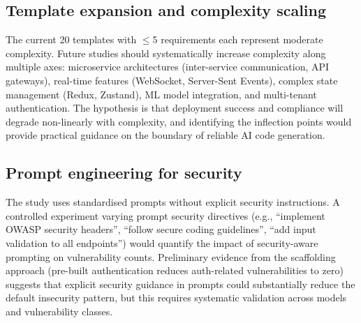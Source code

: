 \subsection{Template expansion and complexity scaling}

The current 20 templates with $\leq$5 requirements each represent moderate complexity. Future studies should systematically increase complexity along multiple axes: microservice architectures (inter-service communication, API gateways), real-time features (WebSocket, Server-Sent Events), complex state management (Redux, Zustand), ML model integration, and multi-tenant authentication. The hypothesis is that deployment success and compliance will degrade non-linearly with complexity, and identifying the inflection points would provide practical guidance on the boundary of reliable AI code generation.

\subsection{Prompt engineering for security}

The study uses standardised prompts without explicit security instructions. A controlled experiment varying prompt security directives (e.g., ``implement OWASP security headers'', ``follow secure coding guidelines'', ``add input validation to all endpoints'') would quantify the impact of security-aware prompting on vulnerability counts. Preliminary evidence from the scaffolding approach (pre-built authentication reduces auth-related vulnerabilities to zero) suggests that explicit security guidance in prompts could substantially reduce the default insecurity pattern, but this requires systematic validation across models and vulnerability classes.
